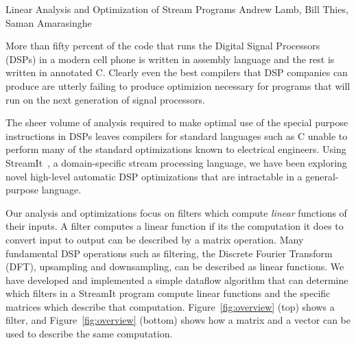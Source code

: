 

\formattitlecontents 
{Linear Analysis and Optimization of Stream Programs}
{Andrew Lamb, Bill Thies, Saman Amarasinghe}


%

More than fifty percent of the code that runs the Digital Signal Processors
(DSPs) in a modern cell phone is written in assembly language and the 
rest is written in annotated C\cite{gass-talk}. Clearly even the best 
compilers that DSP companies can produce are utterly failing to produce
optimizion necessary for programs that will run on the next generation
of signal processors.

The sheer volume of analysis required to make optimal use of the special 
purpose instructions in DSPs leaves compilers for standard languages such 
as C unable to perform many of the standard optimizations known to electrical 
engineers. Using StreamIt~\cite{streamit-asplos,streamitcc}, a domain-specific 
stream processing language, we have been exploring novel high-level automatic 
DSP optimizations that are intractable in a general-purpose
language.

Our analysis and optimizations focus on filters which compute {\it linear} 
functions of their inputs. A filter computes a linear function if its
the computation it does to convert input to output can be described by a 
matrix operation. Many fundamental DSP operations such as filtering, the
Discrete Fourier Transform (DFT), upsampling and downsampling, can be described 
as linear functions. We have developed and implemented a simple dataflow 
algorithm that can determine which filters in a StreamIt program compute 
linear functions and the specific matrices which describe that computation.
Figure~\ref{fig:overview} (top) shows a filter, and Figure~\ref{fig:overview}
(bottom) shows how a matrix and a vector can be used to describe the same
computation.

